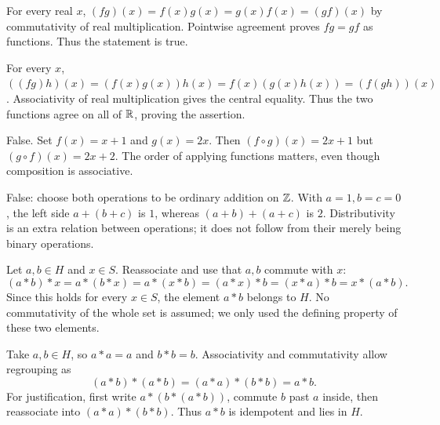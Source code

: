 
For every real $x$, $(fg)(x)=f(x)g(x)=g(x)f(x)=(gf)(x)$ by commutativity of real multiplication. Pointwise agreement proves $fg=gf$ as functions. Thus the statement is true.


For every $x$, $((fg)h)(x)=(f(x)g(x))h(x)=f(x)(g(x)h(x))=(f(gh))(x)$. Associativity of real multiplication gives the central equality. Thus the two functions agree on all of $\mathbb{R}$, proving the assertion.


False. Set $f(x)=x+1$ and $g(x)=2x$. Then $(f\circ g)(x)=2x+1$ but $(g\circ f)(x)=2x+2$. The order of applying functions matters, even though composition is associative.


False: choose both operations to be ordinary addition on $\mathbb{Z}$. With $a=1,b=c=0$, the left side $a+(b+c)$ is $1$, whereas $(a+b)+(a+c)$ is $2$. Distributivity is an extra relation between operations; it does not follow from their merely being binary operations.


Let $a,b\in H$ and $x\in S$. Reassociate and use that $a,b$ commute with $x$:
\[(a*b)*x=a*(b*x)=a*(x*b)=(a*x)*b=(x*a)*b=x*(a*b).
\]
Since this holds for every $x\in S$, the element $a*b$ belongs to $H$. No commutativity of the whole set is assumed; we only used the defining property of these two elements.


Take $a,b\in H$, so $a*a=a$ and $b*b=b$. Associativity and commutativity allow regrouping as
\[(a*b)*(a*b)=(a*a)*(b*b)=a*b.
\]
For justification, first write $a*(b*(a*b))$, commute $b$ past $a$ inside, then reassociate into $(a*a)*(b*b)$. Thus $a*b$ is idempotent and lies in $H$.
